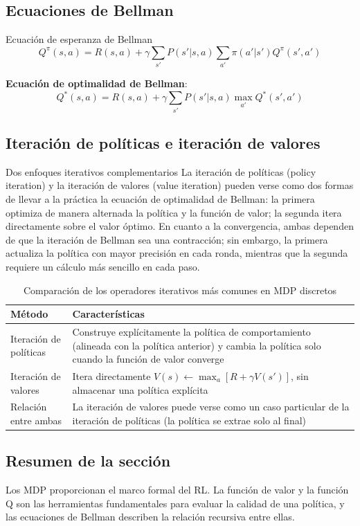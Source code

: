 \subsection{Ecuaciones de Bellman}

\begin{importantbox}{Ecuación de esperanza de Bellman}
$$Q^\pi(s, a) = R(s, a) + \gamma \sum_{s'} P(s'|s,a) \sum_{a'} \pi(a'|s') Q^\pi(s', a')$$

\textbf{Ecuación de optimalidad de Bellman}:
$$Q^*(s, a) = R(s, a) + \gamma \sum_{s'} P(s'|s,a) \max_{a'} Q^*(s', a')$$
\end{importantbox}

\subsection{Iteración de políticas e iteración de valores}

\begin{knowledgebox}{Dos enfoques iterativos complementarios}
La iteración de políticas (policy iteration) y la iteración de valores (value iteration) pueden verse como dos formas de llevar a la práctica la ecuación de optimalidad de Bellman: la primera optimiza de manera alternada la política y la función de valor; la segunda itera directamente sobre el valor óptimo. En cuanto a la convergencia, ambas dependen de que la iteración de Bellman sea una contracción; sin embargo, la primera actualiza la política con mayor precisión en cada ronda, mientras que la segunda requiere un cálculo más sencillo en cada paso.
\end{knowledgebox}

\begin{table}[H]
\centering
\begin{tabular}{ll}
\toprule
Método & Características \\
\midrule
Iteración de políticas & Construye explícitamente la política de comportamiento (alineada con la política anterior) y cambia la política solo cuando la función de valor converge \\
Iteración de valores & Itera directamente $V(s) \leftarrow \max_a [R+\gamma V(s')]$, sin almacenar una política explícita \\
Relación entre ambas & La iteración de valores puede verse como un caso particular de la iteración de políticas (la política se extrae solo al final) \\
\bottomrule
\end{tabular}
\caption{Comparación de los operadores iterativos más comunes en MDP discretos}
\label{tab:mdp-iteration}
\end{table}

\subsection{Resumen de la sección}

Los MDP proporcionan el marco formal del RL. La función de valor y la función Q son las herramientas fundamentales para evaluar la calidad de una política, y las ecuaciones de Bellman describen la relación recursiva entre ellas.
